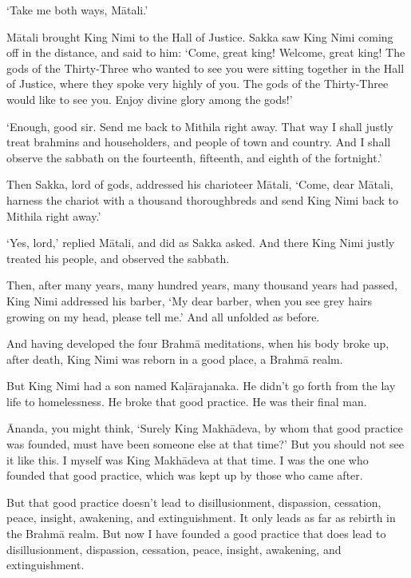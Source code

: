 \documentclass[12pt,openany]{book}%
\begin{document}
‘Take me both ways, \textsanskrit{Mātali}.’ 

\textsanskrit{Mātali} brought King Nimi to the Hall of Justice. Sakka saw King Nimi coming off in the distance, and said to him: ‘Come, great king! Welcome, great king! The gods of the Thirty-Three who wanted to see you were sitting together in the Hall of Justice, where they spoke very highly of you. The gods of the Thirty-Three would like to see you. Enjoy divine glory among the gods!’ 

‘Enough, good sir. Send me back to Mithila right away. That way I shall justly treat brahmins and householders, and people of town and country. And I shall observe the sabbath on the fourteenth, fifteenth, and eighth of the fortnight.’ 

Then Sakka, lord of gods, addressed his charioteer \textsanskrit{Mātali}, ‘Come, dear \textsanskrit{Mātali}, harness the chariot with a thousand thoroughbreds and send King Nimi back to Mithila right away.’ 

‘Yes, lord,’ replied \textsanskrit{Mātali}, and did as Sakka asked. And there King Nimi justly treated his people, and observed the sabbath. 

Then, after many years, many hundred years, many thousand years had passed, King Nimi addressed his barber, ‘My dear barber, when you see grey hairs growing on my head, please tell me.’ And all unfolded as before. 

And having developed the four \textsanskrit{Brahmā} meditations, when his body broke up, after death, King Nimi was reborn in a good place, a \textsanskrit{Brahmā} realm. 

But King Nimi had a son named \textsanskrit{Kaḷārajanaka}. He didn’t go forth from the lay life to homelessness. He broke that good practice. He was their final man. 

Ānanda, you might think, ‘Surely King \textsanskrit{Makhādeva}, by whom that good practice was founded, must have been someone else at that time?’ But you should not see it like this. I myself was King \textsanskrit{Makhādeva} at that time. I was the one who founded that good practice, which was kept up by those who came after. 

But that good practice doesn’t lead to disillusionment, dispassion, cessation, peace, insight, awakening, and extinguishment. It only leads as far as rebirth in the \textsanskrit{Brahmā} realm. But now I have founded a good practice that does lead to disillusionment, dispassion, cessation, peace, insight, awakening, and extinguishment. 
\end{document}
